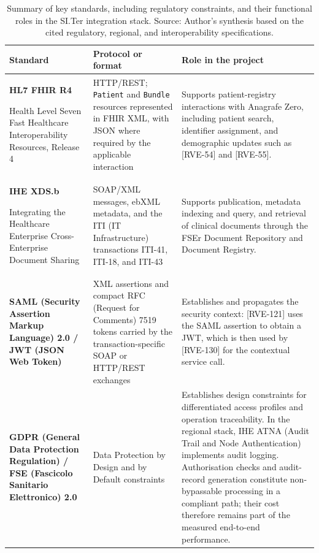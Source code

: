 \begingroup
\renewcommand{\arraystretch}{1.0}
\begin{table}[H]
    \centering
    \caption[Summary of key standards]{Summary of key standards, including regulatory constraints, and
    their functional roles in the SI.Ter integration stack. Source: Author's
    synthesis based on the cited regulatory, regional, and interoperability
    specifications.}
    \label{tab:siter-interoperability-standards}
    \scriptsize
    \setlength{\tabcolsep}{3.5pt}
\begin{tabular}{|>{\raggedright\arraybackslash}p{3.0cm}|>{\raggedright\arraybackslash}p{4.0cm}|>{\raggedright\arraybackslash}p{5.4cm}|}
    \hline
    \rowcolor{veryPeri!18}
    \textbf{Standard} & \textbf{Protocol or format} & \textbf{Role in the project} \\
    \hline
    \rowcolor{tableGray}
    \textbf{HL7 FHIR R4}\par
    {\footnotesize Health Level Seven Fast Healthcare Interoperability Resources, Release 4}
    & HTTP/REST; \texttt{Patient} and \texttt{Bundle} resources represented in FHIR XML, with JSON where required by the applicable interaction
    & Supports patient-registry interactions with Anagrafe Zero, including patient search, identifier assignment, and demographic updates such as [RVE-54] and [RVE-55]. \\
    \hline
    \textbf{IHE XDS.b}\par
    {\footnotesize Integrating the Healthcare Enterprise Cross-Enterprise Document Sharing}
    & SOAP/XML messages, ebXML metadata, and the ITI (IT Infrastructure) transactions ITI-41, ITI-18, and ITI-43
    & Supports publication, metadata indexing and query, and retrieval of clinical documents through the FSEr Document Repository and Document Registry. \\
    \hline
    \rowcolor{tableGray}
    \textbf{SAML (Security Assertion Markup Language)\glsadd{saml} 2.0 / JWT (JSON Web Token)\glsadd{jwt}}
    & XML assertions and compact RFC (Request for Comments) 7519 tokens carried by the transaction-specific SOAP or HTTP/REST exchanges
    & Establishes and propagates the security context: [RVE-121] uses the SAML assertion to obtain a JWT, which is then used by [RVE-130] for the contextual service call. \\
    \hline
    \textbf{GDPR (General Data Protection Regulation) / FSE (Fascicolo Sanitario Elettronico)\glsadd{fse} 2.0}
    & Data Protection by Design and by Default constraints
    & Establishes design constraints for differentiated access profiles and operation traceability. In the regional stack, IHE ATNA (Audit Trail and Node Authentication)\glsadd{atna} implements audit logging. Authorisation checks and audit-record generation constitute non-bypassable processing in a compliant path; their cost therefore remains part of the measured end-to-end performance. \\

\end{tabular}
\end{table}
